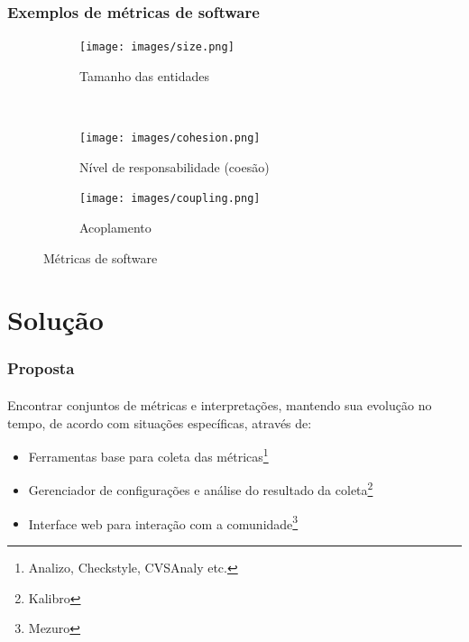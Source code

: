 \documentclass{beamer}
\begin{document}
\begin{frame}
\frametitle{Exemplos de métricas de software}


  \begin{figure}
        \begin{subfigure}[b]{0.3\textwidth}
      \texttt{[image: images/size.png]}
                \caption*{Tamanho das entidades}

        \end{subfigure}\qquad\qquad\qquad\qquad\qquad%
        ~ %
        \begin{subfigure}[b]{0.3\textwidth}
      \texttt{[image: images/cohesion.png]}
                \caption*{Nível de responsabilidade (coesão)}
        \end{subfigure}
        \begin{subfigure}[b]{0.3\textwidth}

      \texttt{[image: images/coupling.png]}
                \caption*{Acoplamento}

        \end{subfigure}
        \caption{Métricas de software}\label{fig:animals}
\end{figure}

\end{frame}

\section{Solução}

\begin{frame}
  \frametitle{Proposta}
  \framesubtitle{}

  Encontrar conjuntos de métricas e interpretações, mantendo sua evolução no tempo, de acordo com situações específicas, através de:
  \begin{itemize}
    \item Ferramentas base para coleta das métricas\footnote{Analizo, Checkstyle, CVSAnaly etc.}
    \item Gerenciador de configurações e análise do resultado da coleta\footnote{Kalibro}
    \item Interface web para interação com a comunidade\footnote{Mezuro}
  \end{itemize}


\end{frame}
\end{document}
